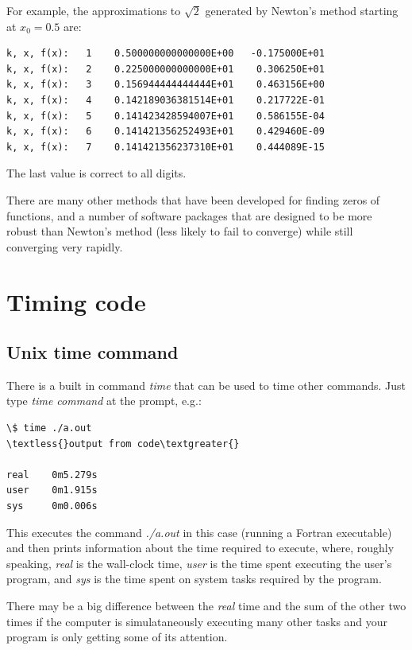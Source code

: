 \documentclass[letterpaper,10pt,english]{sphinxmanual}
\begin{document}
For example, the approximations to $\sqrt{2}$ generated by Newton's
method starting at $x_0=0.5$ are:

\begin{Verbatim}[commandchars=\\\{\}]
k, x, f(x):   1    0.500000000000000E+00   -0.175000E+01
k, x, f(x):   2    0.225000000000000E+01    0.306250E+01
k, x, f(x):   3    0.156944444444444E+01    0.463156E+00
k, x, f(x):   4    0.142189036381514E+01    0.217722E-01
k, x, f(x):   5    0.141423428594007E+01    0.586155E-04
k, x, f(x):   6    0.141421356252493E+01    0.429460E-09
k, x, f(x):   7    0.141421356237310E+01    0.444089E-15
\end{Verbatim}

The last value is correct to all digits.

There are many other methods that have been developed for finding zeros of
functions, and a number of software packages that are designed to be more
robust than Newton's method (less likely to fail to converge) while still
converging very rapidly.


\section{Timing code}
\label{timing:timing}\label{timing::doc}\label{timing:timing-code}

\subsection{Unix time command}
\label{timing:unix-time-command}\label{timing:timing-unix}
There is a built in command \emph{time} that can be used to time other commands.
Just type \emph{time command} at the prompt, e.g.:

\begin{Verbatim}[commandchars=\\\{\}]
\$ time ./a.out
\textless{}output from code\textgreater{}

real    0m5.279s
user    0m1.915s
sys     0m0.006s
\end{Verbatim}

This executes the command \emph{./a.out} in this case (running a Fortran
executable) and then prints information
about the time required to execute, where, roughly speaking,
\emph{real} is the wall-clock time, \emph{user} is the time spent executing the
user's program, and \emph{sys} is the time spent on system tasks required by the
program.

There may be a big difference between the \emph{real} time and the sum of the
other two times if the computer is simulataneously executing many other
tasks and your program is only getting some of its attention.
\end{document}
